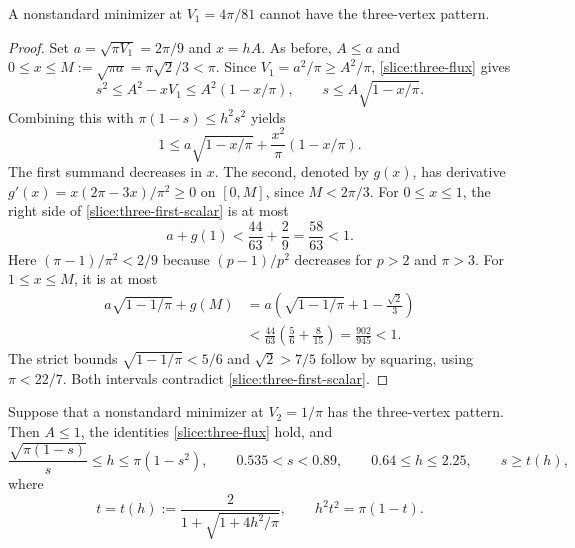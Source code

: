 \begin{proposition}\label{slice:three-first}
A nonstandard minimizer at $V_1=4\pi/81$ cannot have the three-vertex
pattern.
\end{proposition}

\begin{proof}
Set $a=\sqrt{\pi V_1}=2\pi/9$ and $x=hA$.  As before,
$A\le a$ and $0\le x\le M:=\sqrt{\pi a}=\pi\sqrt2/3<\pi$.
Since $V_1=a^2/\pi\ge A^2/\pi$,
\eqref{slice:three-flux} gives
\[
 s^2\le A^2-xV_1\le A^2(1-x/\pi),
 \qquad s\le A\sqrt{1-x/\pi}.
\]
Combining this with $\pi(1-s)\le h^2s^2$ yields
\begin{equation}\label{slice:three-first-scalar}
 1\le a\sqrt{1-x/\pi}
       +\frac{x^2}{\pi}(1-x/\pi).
\end{equation}
The first summand decreases in $x$.  The second, denoted by $g(x)$,
has derivative $g'(x)=x(2\pi-3x)/\pi^2\ge0$ on $[0,M]$, since
$M<2\pi/3$.
For $0\le x\le1$, the right side of
\eqref{slice:three-first-scalar} is at most
\[
 a+g(1)
 <\frac{44}{63}+\frac29=\frac{58}{63}<1.
\]
Here $(\pi-1)/\pi^2<2/9$ because $(p-1)/p^2$ decreases for $p>2$
and $\pi>3$.  For $1\le x\le M$, it is at most
\begin{align*}
 a\sqrt{1-1/\pi}+g(M)
 &=a\left(\sqrt{1-1/\pi}+1-\frac{\sqrt2}{3}\right)\\
 &<\frac{44}{63}\left(\frac56+\frac8{15}\right)
 =\frac{902}{945}<1.
\end{align*}
The strict bounds $\sqrt{1-1/\pi}<5/6$ and $\sqrt2>7/5$ follow
by squaring, using $\pi<22/7$.  Both intervals contradict
\eqref{slice:three-first-scalar}.
\end{proof}

\begin{proposition}\label{slice:three-second-parameters}
Suppose that a nonstandard minimizer at $V_2=1/\pi$ has the
three-vertex pattern.  Then $A\le1$, the identities
\eqref{slice:three-flux} hold, and
\begin{equation}\label{slice:three-parameters}
 \frac{\sqrt{\pi(1-s)}}s\le h\le\pi(1-s^2),\qquad
 0.535<s<0.89,\qquad 0.64\le h\le2.25,\qquad s\ge t(h),
\end{equation}
where
\begin{equation}\label{slice:t-definition}
 t=t(h):=\frac{2}{1+\sqrt{1+4h^2/\pi}},
 \qquad h^2t^2=\pi(1-t).
\end{equation}
\end{proposition}

